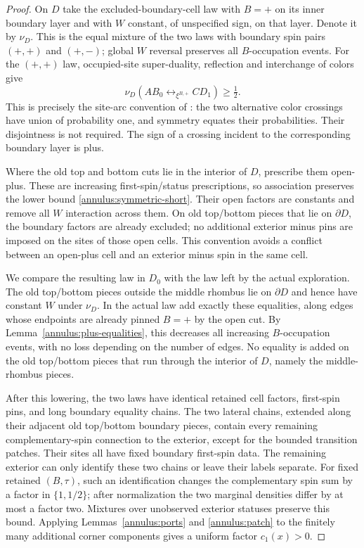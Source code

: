 \begin{proof}
On $D$ take the excluded-boundary-cell law with $B=+$ on its inner
boundary layer and with $W$ constant, of unspecified sign, on that
layer. Denote it by $\nu_D$. This is the equal mixture of the two laws
with boundary spin pairs $(+,+)$ and $(+,-)$; global $W$ reversal
preserves all $B$-occupation events. For the $(+,+)$ law, occupied-site
super-duality, reflection and interchange of colors give
\begin{equation}\label{annulus:symmetric-short}
 \nu_D(AB_0\mathrel{\longleftrightarrow}_{\xi^{B,+}}CD_1)
 \geq\tfrac12.
\end{equation}
This is precisely the site-arc convention of
\cite[Lemma~3.17]{GL2025}: the two alternative color crossings have
union of probability one, and symmetry equates their probabilities.
Their disjointness is not required. The sign of a crossing incident to
the corresponding boundary layer is plus.

Where the old top and bottom cuts lie in the interior of $D$, prescribe
them open-plus. These are increasing first-spin/status prescriptions,
so association preserves the lower bound
\eqref{annulus:symmetric-short}. Their open factors are constants and
remove all $W$ interaction across them. On old top/bottom pieces that
lie on $\partial D$, the boundary factors are already excluded; no
additional exterior minus pins are imposed on the sites of those
open cells. This convention avoids a conflict between an open-plus
cell and an exterior minus spin in the same cell.

We compare the resulting law in $D_0$ with the law left by the actual
exploration. The old top/bottom pieces outside the middle rhombus lie
on $\partial D$ and hence have constant $W$ under $\nu_D$. In the
actual law add exactly these equalities, along edges whose endpoints
are already pinned $B=+$ by the open cut. By
Lemma~\ref{annulus:plus-equalities}, this decreases all increasing
$B$-occupation events, with no loss depending on the number of edges.
No equality is added on the old top/bottom pieces that run through the
interior of $D$, namely the middle-rhombus pieces.

After this lowering, the two laws have identical retained cell
factors, first-spin pins, and long boundary equality chains. The two
lateral chains, extended along their adjacent old top/bottom boundary
pieces, contain every remaining complementary-spin connection to the
exterior, except for the bounded transition patches. Their sites all
have fixed boundary first-spin data. The remaining exterior can only
identify these two chains or leave their labels separate. For fixed
retained $(B,\tau)$, such an identification changes the complementary
spin sum by a factor in $\{1,1/2\}$; after normalization the two
marginal densities differ by at most a factor two. Mixtures over
unobserved exterior statuses preserve this bound. Applying
Lemmas~\ref{annulus:ports} and \ref{annulus:patch} to the finitely many
additional corner components gives a uniform factor $c_1(x)>0$.


\end{proof}
